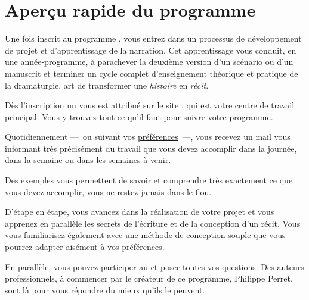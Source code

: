 % 
% 
% 
% 
% 
% 
% 
% 

\section{Aperçu rapide du programme}\hypertarget{overview}{}\label{overview}

Une fois inscrit au programme \unan{}, vous entrez dans un processus de développement de projet et d'apprentissage de la narration. Cet apprentissage vous conduit, en une année-programme, à parachever la deuxième version d'un scénario ou d'un manuscrit et terminer un cycle complet d'enseignement théorique et pratique de la dramaturgie, art de transformer une \emph{histoire} en \emph{récit}.

Dès l'inscription un \bureau{} vous est attribué sur le site \boa{}, qui est votre centre de travail principal. Vous y trouvez tout ce qu'il faut pour suivre votre programme.

Quotidiennement —~{}ou suivant vos \hyperlink{preferences-auteur}{préférences}~{}—, vous recevez un mail vous informant très précisément du travail que vous devez accomplir dans la journée, dans la semaine ou dans les semaines à venir.

Des exemples vous permettent de savoir et comprendre très exactement ce que vous devez accomplir, vous ne restez jamais dans le flou.

D'étape en étape, vous avancez dans la réalisation de votre projet et vous apprenez en parallèle les secrets de l'écriture et de la conception d'un récit. Vous vous familiarisez également avec une méthode de conception souple que vous pourrez adapter aisément à vos préférences.

En parallèle, vous pouvez participer au \forum{} et poser toutes vos questions. Des auteurs professionnels, à commencer par le créateur de ce programme, Philippe Perret, sont là pour vous répondre du mieux qu'ils le peuvent.

